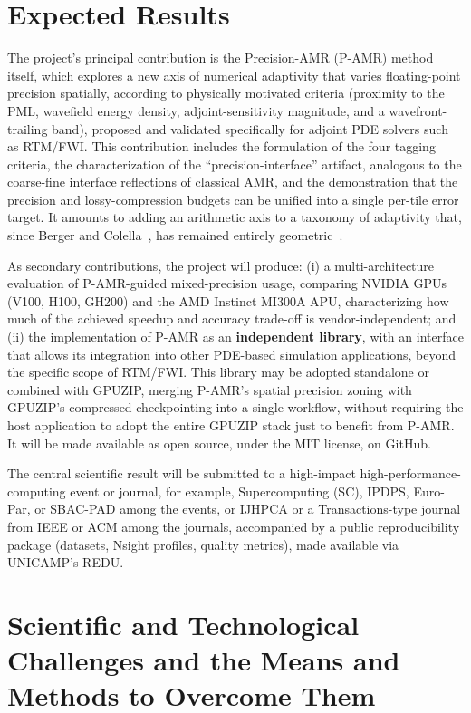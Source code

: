 \documentclass[12pt,a4paper]{article}
\newcommand{\pamr}{P\nobreakdash-AMR}
\begin{document}
\section{Expected Results}

The project's principal contribution is the Precision-AMR (\pamr{}) method
itself, which explores a new axis of numerical adaptivity that varies
floating-point precision spatially, according to physically motivated
criteria (proximity to the PML, wavefield energy density, adjoint-sensitivity
magnitude, and a wavefront-trailing band), proposed and validated
specifically for adjoint PDE solvers such as RTM/FWI. This contribution
includes the formulation of the four tagging criteria, the characterization
of the ``precision-interface'' artifact, analogous to the coarse-fine
interface reflections of classical AMR, and the demonstration that the
precision and lossy-compression budgets can be unified into a single
per-tile error target. It amounts to adding an arithmetic axis to a
taxonomy of adaptivity that, since Berger and Colella~\cite{berger1989amr},
has remained entirely geometric~\cite{vivarelli2025review}.

As secondary contributions, the project will produce: (i) a
multi-architecture evaluation of P-AMR-guided mixed-precision usage,
comparing NVIDIA GPUs (V100, H100, GH200) and the AMD Instinct MI300A APU,
characterizing how much of the achieved speedup and accuracy trade-off is
vendor-independent; and (ii) the implementation of P-AMR as an
\textbf{independent library}, with an interface that allows its integration
into other PDE-based simulation applications, beyond the specific scope of
RTM/FWI. This library may be adopted standalone or combined with GPUZIP,
merging P-AMR's spatial precision zoning with GPUZIP's compressed
checkpointing into a single workflow, without requiring the host application
to adopt the entire GPUZIP stack just to benefit from P-AMR. It will be made
available as open source, under the MIT license, on GitHub.

The central scientific result will be submitted to a high-impact
high-performance-computing event or journal, for example, Supercomputing
(SC), IPDPS, Euro-Par, or SBAC-PAD among the events, or IJHPCA or a
Transactions-type journal from IEEE or ACM among the journals, accompanied
by a public reproducibility package (datasets, Nsight profiles, quality
metrics), made available via UNICAMP's REDU.

\section{Scientific and Technological Challenges and the Means and Methods
to Overcome Them}
\end{document}
